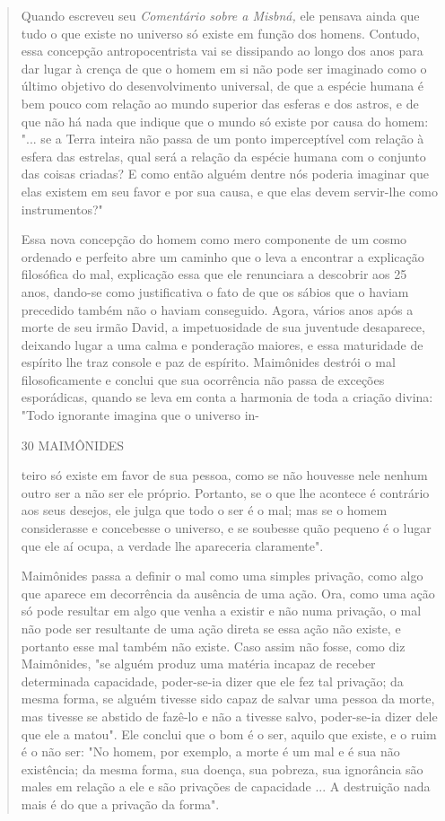 \begin{quote}
Quando escreveu seu \emph{Comentário sobre a Misbná,} ele pensava ain­da
que tudo o que existe no universo só existe em função dos homens.
Contu­do, essa concepção antropocentrista vai se dissipando ao longo dos
anos para dar lugar à crença de que o homem em si não pode ser imaginado
como o últi­mo objetivo do desenvolvimento universal, de que a espécie
humana é bem pouco com relação ao mundo superior das esferas e dos
astros, e de que não há nada que indique que o mundo só existe por causa
do homem: "... se a Ter­ra inteira não passa de um ponto imperceptível
com relação à esfera das estre­las, qual será a relação da espécie
humana com o conjunto das coisas criadas? E como então alguém dentre nós
poderia imaginar que elas existem em seu fa­vor e por sua causa, e que
elas devem servir-lhe como instrumentos?"

Essa nova concepção do homem como mero componente de um cosmo ordenado e
perfeito abre um caminho que o leva a encontrar a explica­ção filosófica
do mal, explicação essa que ele renunciara a descobrir aos 25 anos,
dando-se como justificativa o fato de que os sábios que o haviam
precedido também não o haviam conseguido. Agora, vários anos após a
morte de seu ir­mão David, a impetuosidade de sua juventude desaparece,
deixando lugar a uma calma e ponderação maiores, e essa maturidade de
espírito lhe traz console e paz de espírito. Maimônides destrói o mal
filosoficamente e conclui que sua ocorrência não passa de exceções
esporádicas, quando se leva em conta a har­monia de toda a criação
divina: "Todo ignorante imagina que o universo in-

30 MAIMÔNIDES

teiro só existe em favor de sua pessoa, como se não houvesse nele nenhum
outro ser a não ser ele próprio. Portanto, se o que lhe acontece é
contrário aos seus desejos, ele julga que todo o ser é o mal; mas se o
homem considerasse e concebesse o universo, e se soubesse quão pequeno é
o lugar que ele aí ocu­pa, a verdade lhe apareceria claramente".

Maimônides passa a definir o mal como uma simples privação, co­mo algo
que aparece em decorrência da ausência de uma ação. Ora, como uma ação
só pode resultar em algo que venha a existir e não numa privação, o mal
não pode ser resultante de uma ação direta se essa ação não existe, e
portanto esse mal também não existe. Caso assim não fosse, como diz
Maimônides, "se alguém produz uma matéria incapaz de receber determinada
capacidade, poder-se-ia dizer que ele fez tal privação; da mesma forma,
se alguém tivesse sido ca­paz de salvar uma pessoa da morte, mas tivesse
se abstido de fazê-lo e não a tivesse salvo, poder-se-ia dizer dele que
ele a matou". Ele conclui que o bom é o ser, aquilo que existe, e o ruim
é o não ser: "No homem, por exemplo, a morte é um mal e é sua não
existência; da mesma forma, sua doença, sua po­breza, sua ignorância são
males em relação a ele e são privações de capacidade ... A destruição
nada mais é do que a privação da forma".


\end{quote}

